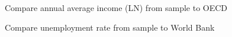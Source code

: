 \begin{figure}
    \caption{Compare annual average income (LN) from sample to OECD}
    \label{graph_descriptives_income_better_paper.pdf}
\end{figure}

\begin{figure}
    \caption{Compare unemployment rate from sample to World Bank}
    \label{graph_descriptives_unmp_paper}
\end{figure}

